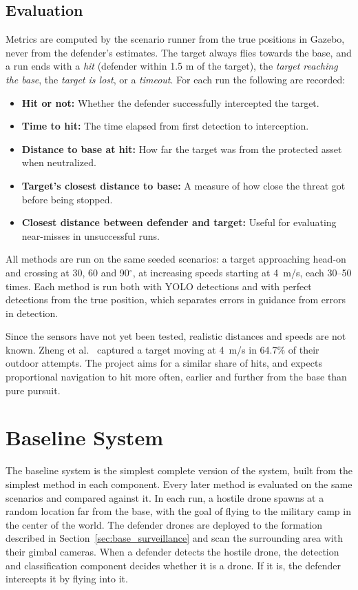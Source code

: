 \documentclass{article}
\begin{document}
\subsection{Evaluation}
Metrics are computed by the scenario runner from the true positions in
Gazebo, never from the defender's estimates. The target always flies towards
the base, and a run ends with a \emph{hit} (defender within 1.5 m  of
the target), the \emph{target reaching the base}, the \emph{target is lost}, or a \emph{timeout}. For each run the following are
recorded: 

\begin{itemize}
    \item \textbf{Hit or not:} Whether the defender successfully intercepted the target.
    \item \textbf{Time to hit:} The time elapsed from first detection to interception.
    \item \textbf{Distance to base at hit:} How far the target was from the protected asset when neutralized.
    \item \textbf{Target's closest distance to base:} A measure of how close the threat got before being stopped.
    \item \textbf{Closest distance between defender and target:} Useful for evaluating near-misses in unsuccessful runs.
\end{itemize}

All methods are run on the same seeded scenarios: a target approaching
head-on and crossing at 30, 60 and 90$^\circ$, at increasing speeds
starting at 4~m/s, each 30--50 times. Each method is run both with YOLO detections and with perfect detections from the true position, which
separates errors in guidance from errors in detection.

Since the sensors have not yet been tested, realistic distances and speeds
are not known. Zheng et al.\ \cite{zheng2025mcm} captured a target moving at
4~m/s in 64.7\% of their outdoor attempts. The project aims for a similar
share of hits, and expects proportional navigation to hit more often,
earlier and further from the base than pure pursuit.


\newpage
\section{Baseline System}\label{sec:baseline}
The baseline system is the simplest complete version of the system, built
from the simplest method in each component. Every later method is evaluated
on the same scenarios and compared against it. In each run, a hostile drone spawns at a random location far from the base, with the goal of flying to the military camp in the center of the world. The defender drones are deployed to the formation described in Section~\ref{sec:base_surveillance} and scan the surrounding area with their gimbal cameras. When a defender detects the hostile drone, the detection and classification component decides whether it is a drone. If it is, the defender intercepts it by flying into it.
\end{document}
